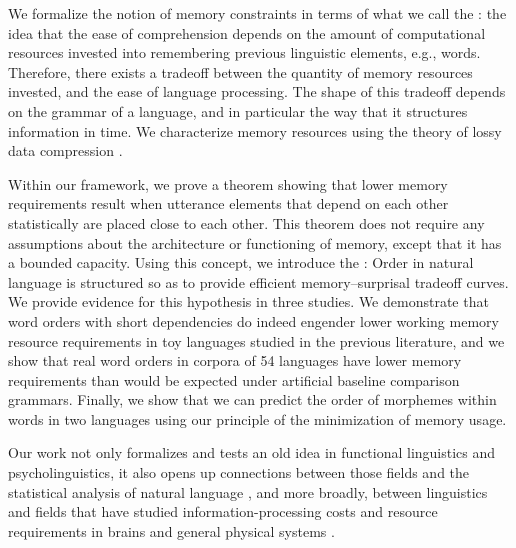 We formalize the notion of memory constraints in terms of what we call the : the idea that the ease of comprehension depends on the amount of computational resources invested into remembering previous linguistic elements, e.g., words. 
Therefore, there exists a tradeoff between the quantity of memory resources invested, and the ease of language processing.
The shape of this tradeoff depends on the grammar of a language, and in particular the way that it structures information in time.
We characterize memory resources using the theory of lossy data compression \citep{cover2006elements,berger2003rate}.%

Within our framework, we prove a theorem showing that lower memory requirements result when utterance elements that depend on each other statistically are placed close to each other. 
This theorem does not require any assumptions about the architecture or functioning of memory, except that it has a bounded capacity.
Using this concept, we introduce the : Order in natural language is structured so as to provide efficient memory--surprisal tradeoff curves.
We provide evidence for this hypothesis in three studies.
We demonstrate that word orders with short dependencies do indeed engender lower working memory resource requirements in toy languages studied in the previous literature, and we show that real word orders in corpora of 54 languages have lower memory requirements than would be expected under artificial baseline comparison grammars. 
Finally, we show that we can predict the order of morphemes within words in two languages using our principle of the minimization of memory usage.

Our work not only formalizes and tests an old idea in functional linguistics and psycholinguistics, it also opens up connections between those fields and the statistical analysis of natural language \citep{debowski-excess-2011,bentz2017entropy,lin-critical-2017}, and more broadly, between linguistics and fields that have studied information-processing costs and resource requirements in brains \citep[e.g.,][]{friston2010free} and general physical systems \citep[e.g.,][]{still2012thermodynamic}. 





